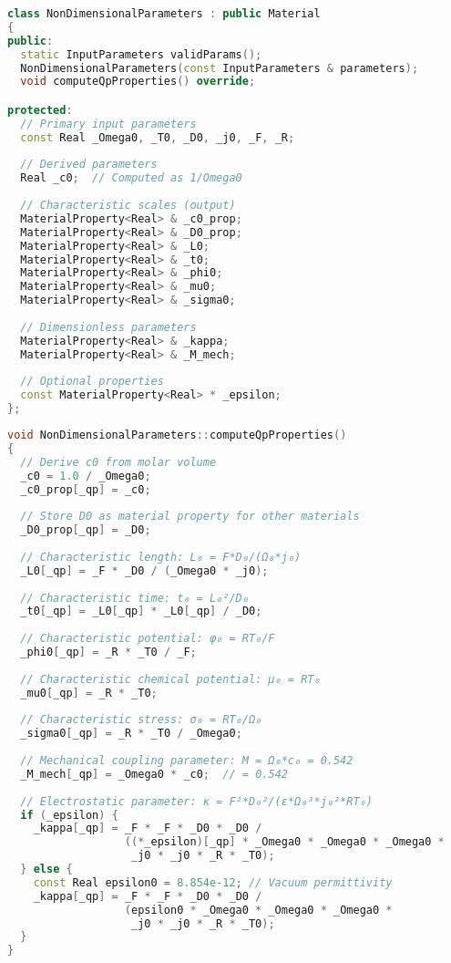 \documentclass[11pt,a4paper]{article}
\begin{document}
\begin{lstlisting}[language=C++, caption=NonDimensionalParameters Header]
class NonDimensionalParameters : public Material
{
public:
  static InputParameters validParams();
  NonDimensionalParameters(const InputParameters & parameters);
  void computeQpProperties() override;

protected:
  // Primary input parameters
  const Real _Omega0, _T0, _D0, _j0, _F, _R;
  
  // Derived parameters
  Real _c0;  // Computed as 1/Omega0
  
  // Characteristic scales (output)
  MaterialProperty<Real> & _c0_prop;
  MaterialProperty<Real> & _D0_prop;
  MaterialProperty<Real> & _L0;
  MaterialProperty<Real> & _t0;
  MaterialProperty<Real> & _phi0;
  MaterialProperty<Real> & _mu0;
  MaterialProperty<Real> & _sigma0;
  
  // Dimensionless parameters
  MaterialProperty<Real> & _kappa;
  MaterialProperty<Real> & _M_mech;
  
  // Optional properties
  const MaterialProperty<Real> * _epsilon;
};
\end{lstlisting}

\begin{lstlisting}[language=C++, caption=NonDimensionalParameters Implementation]
void NonDimensionalParameters::computeQpProperties()
{
  // Derive c0 from molar volume
  _c0 = 1.0 / _Omega0;
  _c0_prop[_qp] = _c0;
  
  // Store D0 as material property for other materials
  _D0_prop[_qp] = _D0;
  
  // Characteristic length: L₀ = F*D₀/(Ω₀*j₀)
  _L0[_qp] = _F * _D0 / (_Omega0 * _j0);
  
  // Characteristic time: t₀ = L₀²/D₀
  _t0[_qp] = _L0[_qp] * _L0[_qp] / _D0;
  
  // Characteristic potential: φ₀ = RT₀/F
  _phi0[_qp] = _R * _T0 / _F;
  
  // Characteristic chemical potential: μ₀ = RT₀
  _mu0[_qp] = _R * _T0;
  
  // Characteristic stress: σ₀ = RT₀/Ω₀
  _sigma0[_qp] = _R * _T0 / _Omega0;
  
  // Mechanical coupling parameter: M = Ω₀*c₀ = 0.542
  _M_mech[_qp] = _Omega0 * _c0;  // = 0.542
  
  // Electrostatic parameter: κ = F²*D₀²/(ε*Ω₀³*j₀²*RT₀)
  if (_epsilon) {
    _kappa[_qp] = _F * _F * _D0 * _D0 / 
                  ((*_epsilon)[_qp] * _Omega0 * _Omega0 * _Omega0 * 
                   _j0 * _j0 * _R * _T0);
  } else {
    const Real epsilon0 = 8.854e-12; // Vacuum permittivity
    _kappa[_qp] = _F * _F * _D0 * _D0 / 
                  (epsilon0 * _Omega0 * _Omega0 * _Omega0 * 
                   _j0 * _j0 * _R * _T0);
  }
}
\end{lstlisting}
\end{document}

